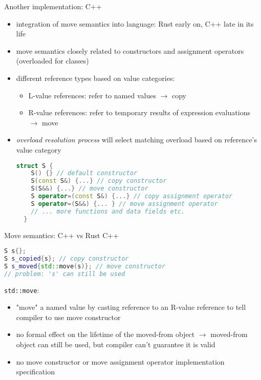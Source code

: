 \documentclass{beamer}
\begin{document}
\begin{frame}[fragile]{Another implementation: C++}
\begin{itemize}
  \item integration of move semantics into language: Rust early on, C++ late in its life
  \item move semantics closely related to constructors and assignment operators (overloaded for classes)
  \item different reference types based on value categories:
  \begin{itemize}
    \item L-value references: refer to named values $\rightarrow$ copy
    \item R-value references: refer to temporary results of expression evaluations $\rightarrow$ move
  \end{itemize}
  \item \emph{overload resolution process} will select matching overload based on reference's value category
  \begin{lstlisting}[language=C++]
  struct S {
    S() {} // default constructor
    S(const S&) {...} // copy constructor
    S(S&&) {...} // move constructor
    S operator=(const S&) {...} // copy assignment operator
    S operator=(S&&) {... } // move assignment operator
    // ... more functions and data fields etc.
  }
  \end{lstlisting}
\end{itemize}
\end{frame}


\begin{frame}[fragile]{Move semantics: C++ vs Rust}
C++
\begin{lstlisting}[language=C++]
S s{};
S s_copied{s}; // copy constructor
S s_moved{std::move(s)}; // move constructor
// problem: 's' can still be used
\end{lstlisting}

\verb|std::move|:
\begin{itemize}
  \item "move" a named value by casting reference to an R-value reference to tell compiler to use move constructor
  \item no formal effect on the lifetime of the moved-from object $\rightarrow$ moved-from object can still be used, but compiler can't guarantee it is valid
  \item no move constructor or move assignment operator implementation specification
\end{itemize}
\end{frame}
\end{document}
